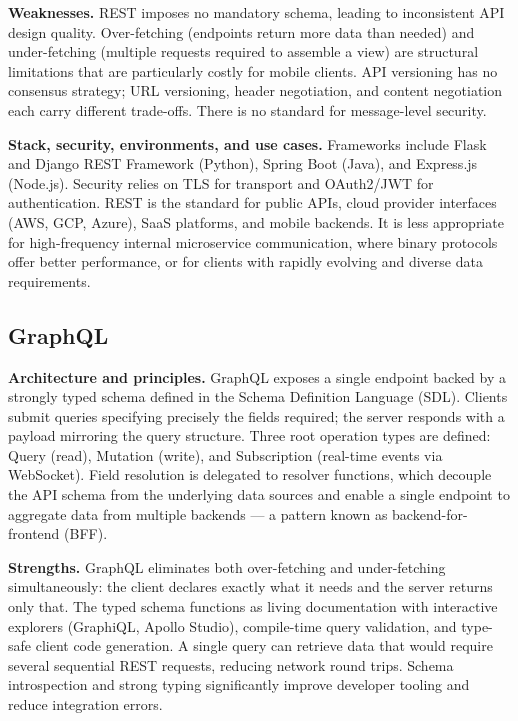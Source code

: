 \documentclass[11pt,a4paper]{article}
\begin{document}
\textbf{Weaknesses.}
REST imposes no mandatory schema, leading to inconsistent API design quality. Over-fetching
(endpoints return more data than needed) and under-fetching (multiple requests required
to assemble a view) are structural limitations that are particularly costly for mobile
clients. API versioning has no consensus strategy; URL versioning, header negotiation, and
content negotiation each carry different trade-offs. There is no standard for message-level
security.

\textbf{Stack, security, environments, and use cases.}
Frameworks include Flask and Django REST Framework (Python), Spring Boot (Java), and
Express.js (Node.js). Security relies on TLS for transport and OAuth2/JWT for
authentication. REST is the standard for public APIs, cloud provider interfaces (AWS,
GCP, Azure), SaaS platforms, and mobile backends. It is less appropriate for
high-frequency internal microservice communication, where binary protocols offer better
performance, or for clients with rapidly evolving and diverse data requirements.

\subsection{GraphQL}

\textbf{Architecture and principles.}
GraphQL exposes a single endpoint backed by a strongly typed schema defined in the
Schema Definition Language (SDL). Clients submit queries specifying precisely the fields
required; the server responds with a payload mirroring the query structure. Three root
operation types are defined: Query (read), Mutation (write), and Subscription
(real-time events via WebSocket). Field resolution is delegated to resolver functions,
which decouple the API schema from the underlying data sources and enable a single
endpoint to aggregate data from multiple backends --- a pattern known as
backend-for-frontend (BFF).

\textbf{Strengths.}
GraphQL eliminates both over-fetching and under-fetching simultaneously: the client
declares exactly what it needs and the server returns only that. The typed schema
functions as living documentation with interactive explorers (GraphiQL, Apollo Studio),
compile-time query validation, and type-safe client code generation. A single query can
retrieve data that would require several sequential REST requests, reducing network round
trips. Schema introspection and strong typing significantly improve developer tooling and
reduce integration errors.
\end{document}
